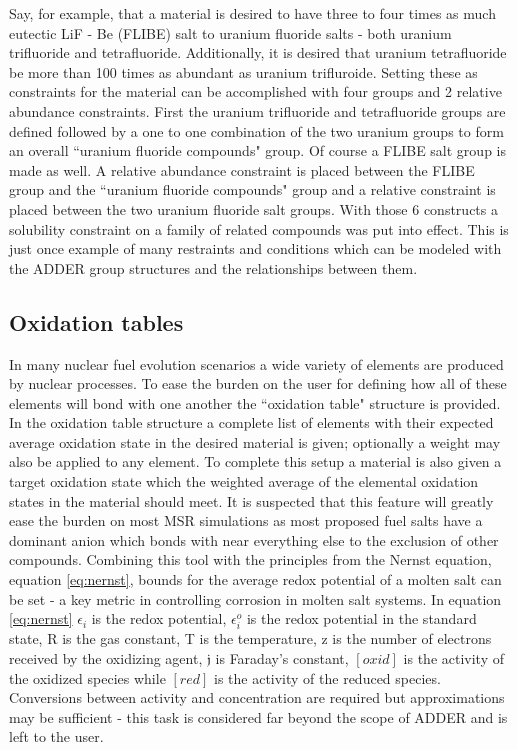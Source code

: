 \documentclass[]{elsarticle}
\def\j{\mathfrak{j}}
\begin{document}
Say, for example, that a material is desired to have three to four times as
much eutectic LiF - Be (FLIBE) salt to uranium fluoride salts - both 
uranium trifluoride and tetrafluoride. Additionally, it is desired that uranium
tetrafluoride be more than 100 times as abundant as uranium trifluroide. Setting
these as constraints for the material can be accomplished with four groups and
2 relative abundance constraints. First the uranium trifluoride and tetrafluoride
groups are defined followed by a one to one combination of the two uranium
groups to form an overall ``uranium fluoride compounds" group. Of course a FLIBE
salt group is made as well. A relative abundance constraint is placed between
the FLIBE group and the ``uranium fluoride compounds" group and a relative
constraint is placed between the two uranium fluoride salt groups. With those
6 constructs a solubility constraint on a family of related compounds was put
into effect. This is just once example of many restraints and conditions which
can be modeled with the ADDER group structures and the relationships between
them.

\subsection{Oxidation tables} \label{ssec:oxi}
In many nuclear fuel evolution scenarios a wide variety of elements are
produced by nuclear processes. To ease the burden on the user for
defining how all of these elements will bond with one another the ``oxidation
table" structure is provided. In the oxidation table structure a complete list
of elements with their expected average oxidation state in the desired
material is given; optionally a weight may also be applied to any element. To complete this setup a material is also given a target
oxidation state which the weighted average of the elemental oxidation states in
the material should meet.
It is suspected that this feature will greatly ease the
burden on most MSR simulations as most proposed fuel salts have a dominant
anion which bonds with near everything else to the exclusion of other
compounds. Combining this tool with the principles from the Nernst equation,
equation \ref{eq:nernst}, bounds for the average redox potential of a molten
salt can be set - a key metric in controlling corrosion in molten salt systems.
In equation \ref{eq:nernst} $\epsilon_{i}$ is the redox potential,
$\epsilon_{i}^{o}$ is the redox potential in the standard state, R is the gas
constant, T is the temperature, z is the number of electrons received by the
oxidizing agent, $\j$ is Faraday's constant, $[oxid]$ is the activity of the oxidized species while $[red]$ is the activity of the reduced species.
Conversions between
activity and concentration are required but approximations may be sufficient -
this task is considered far beyond the scope of ADDER and is left to the user.
\end{document}
